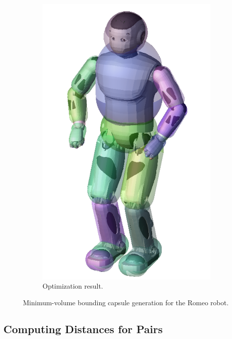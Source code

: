 \begin{figure}
\begin{subfigure}{0.24\columnwidth}
    \includegraphics[width = \columnwidth]
                    {src/chap3-optimal-motion-planning/figure/romeo-capsule.png}
    \caption{Optimization result.}
    \label{simple-path-sol-shortcutb}
  \end{subfigure}
  \caption{Minimum-volume bounding capsule generation for the Romeo
    robot.}
  \label{fig:chap3-romeo-capsule}
\end{figure}

\subsection{Computing Distances for Pairs}

